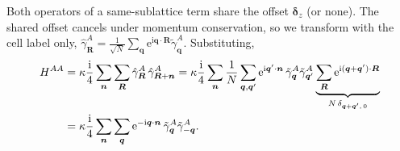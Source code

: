 \documentclass[
  aps,
  prl,
  preprint,
  amsmath,
  amssymb,
  superscriptaddress,
  floatfix
]{revtex4-2}
\newcommand{\ii}{\mathrm{i}}
\newcommand{\ee}{\mathrm{e}}
\newcommand{\oga}{\hat \gamma}
\begin{document}
Both operators of a same-sublattice term share the offset $\bm\delta_z$ (or
none). The shared offset cancels under momentum conservation, so we
transform with the cell label only, $\oga^{A}_{\bm R}=\tfrac{1}{\sqrt N}\sum_{\bm
q}\ee^{\ii\bm q\cdot\bm R}\tilde\gamma^A_{\bm q}$. Substituting,
\begin{align}
  H^{AA}
  &= \kappa\frac{\ii}{4}\sum_{\bm n}\sum_{\bm R}\oga_{\bm R}^{A}\,\oga_{\bm R+\bm n}^{A}
  = \kappa\frac{\ii}{4}\sum_{\bm n}\frac{1}{N}\sum_{\bm q,\bm q'}\ee^{\ii\bm q'\cdot\bm n}\,\tilde\gamma_{\bm q}^{A}\tilde\gamma_{\bm q'}^{A}\underbrace{\sum_{\bm R}\ee^{\ii(\bm q+\bm q')\cdot\bm R}}_{N\,\delta_{\bm q+\bm q',\,0}} \notag\\
  &= \kappa\frac{\ii}{4}\sum_{\bm n}\sum_{\bm q}\ee^{-\ii\bm q\cdot\bm n}\,\tilde\gamma_{\bm q}^{A}\tilde\gamma_{-\bm q}^{A}.
\end{align}
\end{document}
